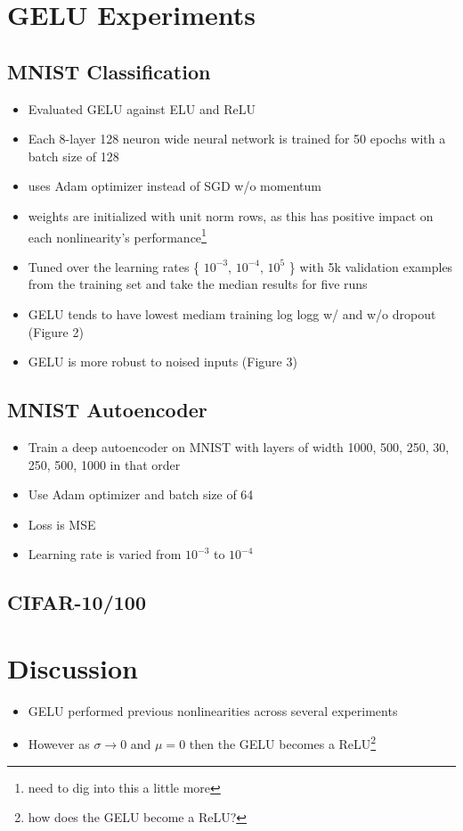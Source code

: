 \section{GELU Experiments}

    \subsection{MNIST Classification}

        \begin{itemize}
            \item Evaluated GELU against ELU and ReLU
            \item Each 8-layer 128 neuron wide neural network is trained for 50 epochs with a batch size of 128
            \item uses Adam optimizer instead of SGD w/o momentum
            \item weights are initialized with unit norm rows, as this has positive impact on each nonlinearity's performance\footnote{need to dig into this a little more}
            \item Tuned over the learning rates \{ $10^{-3}$, $10^{-4}$, $10^{5}$ \} with 5k validation examples from the training set and take the median results for five runs
            \item GELU tends to have lowest mediam training log logg w/ and w/o dropout (Figure 2)
            \item GELU is more robust to noised inputs (Figure 3)
        \end{itemize}

    \subsection{MNIST Autoencoder}

        \begin{itemize}
            \item Train a deep autoencoder on MNIST with layers of width 1000, 500, 250, 30, 250, 500, 1000 in that order
            \item Use Adam optimizer and batch size of 64
            \item Loss is MSE
            \item Learning rate is varied from $10^{-3}$ to $10^{-4}$
        \end{itemize}

    \subsection{CIFAR-10/100}



\section{Discussion}
    \begin{itemize}
        \item GELU performed previous nonlinearities across several experiments
        \item However as \(\sigma \to 0 \) and $\mu=0$ then the GELU becomes a ReLU\footnote{how does the GELU become a ReLU?}
    \end{itemize}

